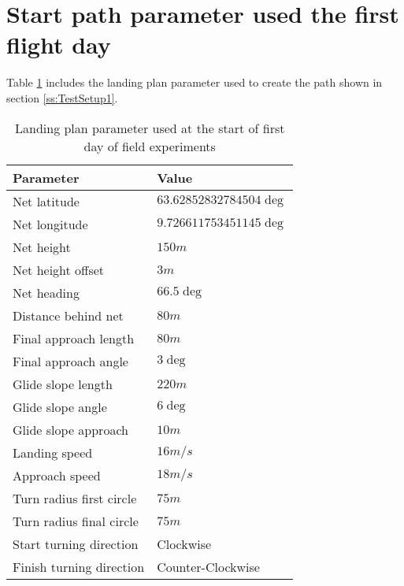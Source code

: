 \section{Start path parameter used the first flight day}\label{AP:SpecDay1}
Table \ref{AP:TB:landingDay1} includes the landing plan parameter used to create the path shown in section \ref{ss:TestSetup1}.
\newpage
\begin{table}[H]
\centering
\begin{tabular}{| p{4cm} | p{4cm} |}
\hline
\textbf{Parameter}			& \textbf{Value}			\\ \hline
Net latitude				& $63.62852832784504 \deg$ 	\\ \hline
Net longitude				& $9.726611753451145 \deg$ 	\\ \hline
Net height					& $150 m$					\\ \hline
Net height offset			& $3 m$ 	\\ \hline
Net heading					& $66.5 \deg$				\\ \hline
Distance behind net			& $80 m$					\\ \hline
Final approach length		& $80 m$					\\ \hline
Final approach angle		& $3 \deg$					\\ \hline
Glide slope length			& $220 m $					\\ \hline
Glide slope angle			& $6 \deg$					\\ \hline
Glide slope approach		& $10 m$					\\ \hline
Landing speed				& $16 m/s$					\\ \hline
Approach speed				& $18 m/s$					\\ \hline
Turn radius first circle	& $75 m$					\\ \hline
Turn radius final circle	& $75 m$					\\ \hline
Start turning direction		& Clockwise					\\ \hline
Finish turning direction	& Counter-Clockwise			\\ \hline
\end{tabular}
\caption{Landing plan parameter used at the start of first day of field experiments}
\label{AP:TB:landingDay1}
\end{table}
